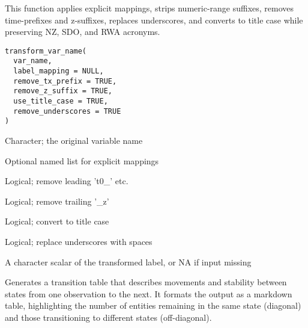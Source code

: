 \documentclass[a4paper]{book}
\begin{document}
%
\begin{Description}
This function applies explicit mappings, strips numeric-range suffixes,
removes time-prefixes and z-suffixes, replaces underscores, and converts
to title case while preserving NZ, SDO, and RWA acronyms.
\end{Description}
%
\begin{Usage}
\begin{verbatim}
transform_var_name(
  var_name,
  label_mapping = NULL,
  remove_tx_prefix = TRUE,
  remove_z_suffix = TRUE,
  use_title_case = TRUE,
  remove_underscores = TRUE
)
\end{verbatim}
\end{Usage}
%
\begin{Arguments}
\begin{ldescription}
\item[\code{var\_name}] Character; the original variable name

\item[\code{label\_mapping}] Optional named list for explicit mappings

\item[\code{remove\_tx\_prefix}] Logical; remove leading 't0\_' etc.

\item[\code{remove\_z\_suffix}] Logical; remove trailing '\_z'

\item[\code{use\_title\_case}] Logical; convert to title case

\item[\code{remove\_underscores}] Logical; replace underscores with spaces
\end{ldescription}
\end{Arguments}
%
\begin{Value}
A character scalar of the transformed label, or NA if input missing
\end{Value}
%
\begin{Description}
Generates a transition table that describes movements and stability between states
from one observation to the next. It formats the output as a markdown table, highlighting
the number of entities remaining in the same state (diagonal) and those transitioning
to different states (off-diagonal).
\end{Description}
\end{document}
